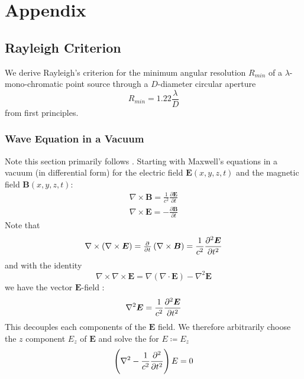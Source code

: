 %
%
%
%
\newcommand*{\E}{\bm{E}}
\newcommand*{\B}{\bm{B}}
\newcommand*{\rr}{\bm{r}}
\newcommand*{\Ef}{\textit{\textbf{E}} }
\section{Appendix}\label{sec:appendix}
\localtableofcontents

\subsection{Rayleigh Criterion}\label{subsec:rayleighcriterion}

We derive Rayleigh's criterion for the minimum angular resolution \(R_{min}\) of a \(\lambda\)-mono-chromatic point source through a \(D\)-diameter circular aperture
%
\begin{equation}
    R_{min} = 1.22 \frac{\lambda}{D} 
\end{equation}
%
from first principles.

\subsubsection{Wave Equation in a Vacuum}

Note this section primarily follows \cite{eom2004electromagnetic}.
%
Starting with Maxwell's equations in a vacuum (in differential form) for the electric field \(\E(x,y,z, t)\) and the magnetic field \(\B(x,y,z, t)\):
%
\begin{align}
    \nabla \times \B = \frac{1}{c^2} \frac{\partial \E}{\partial t} \\
    \nabla \times \E = - \frac{\partial \B}{\partial t}
\end{align}
%
Note that
%
\begin{equation}
    \nabla \times \left( \nabla \times \E \right) = \pd{}{t} \left( \nabla \times \B\right) = \frac{1}{c^2} \pdv[2]{\E}{t}
\end{equation}
%
and with the identity
\begin{equation}
    \nabla \times \nabla \times \E = \nabla (\nabla\cdot \E) - \nabla^2 \E
\end{equation}
%
we have the vector \(\bm{E}\)-field :
%
\begin{equation}
    \nabla^2 \E = \frac{1}{c^2} \pdv[2]{\E}{t}
\end{equation}
%
This decouples each components of the \(\bm{E}\) field. 
%
We therefore arbitrarily choose the \(z\) component \(E_z\) of \(\bm{E}\) and solve the  for \(E \coloneqq E_z\)
%
\begin{equation}
    \left(\nabla^2 - \frac{1}{c^2} \pdv[2]{}{t}\right) E = 0 \label{eqn:scalarwaveeqn}
\end{equation}
%

